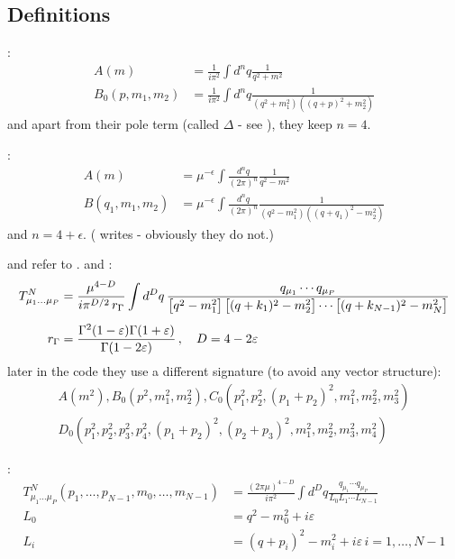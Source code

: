 \subsection{Definitions}
\cite{Passarino:1978jh}:
\begin{align}
A(m) &= \frac 1 {i\pi^2}\int d^nq\frac 1 {q^2+m^2}\\
B_0(p,m_1,m_2) &= \frac 1 {i\pi^2}\int d^nq\frac 1 {(q^2+m_1^2)((q+p)^2+m_2^2)}
\end{align}
and apart from their pole term (called $\Delta$ - see \cite[eq. D.1]{Passarino:1978jh}), they keep $n=4$.

\cite{PhysRevD4054,Bojak:2000eu}:
\begin{align}
A(m) &= \mu^{-\epsilon}\int\frac{d^nq}{(2\pi)^n} \frac 1 {q^2-m^2}\\
B(q_1,m_1,m_2) &= \mu^{-\epsilon}\int\frac{d^nq}{(2\pi)^n} \frac 1 {(q^2-m_1^2)((q+q_1)^2-m_2^2)}
\end{align}
and $n=4+\epsilon$. (\cite{PhysRevD4054} writes  - obviously they do not.)

\HEPMath\cite{wiebusch_hepmath_2015} and \FeynCalc\cite{Mertig:1990an,Shtabovenko:2016sxi} refer to \LoopTools\cite{Hahn:1998yk,LoopTools212Guide}. \cite[eq. (1.1)]{LoopTools212Guide} and \cite[eq. (2.6)]{Ellis:2011cr}:
\begin{align}
T_{\mu_1\ldots\mu_P}^N &=
\frac{\mu^{4 - D}}{i\pi^{D/2}\,r_\Gamma}
\int d^Dq\,
\frac{q_{\mu_1}\cdots q_{\mu_P}}
  {\bigl[q^2 - m_1^2\bigr]\,
   \bigl[(q + k_1)^2 - m_2^2\bigr] \cdots
   \bigl[(q + k_{N - 1})^2 - m_N^2\bigr]} \\[1ex]
\notag
r_\Gamma &= \frac{\Gamma^2(1 - \varepsilon)\Gamma(1+\varepsilon)}
  {\Gamma(1 - 2\varepsilon)}\,,
\quad D = 4 - 2\varepsilon\,
\end{align}
later in the code they use a different signature (to avoid any vector structure):
\begin{align}
A(m^2), B_0(p^2,m_1^2,m_2^2), C_0(p_1^2,p_2^2,(p_1+p_2)^2,m_1^2,m_2^2,m_3^2)\nonumber\\
D_0(p_1^2,p_2^2,p_3^2,p_4^2,(p_1+p_2)^2,(p_2+p_3)^2,m_1^2,m_2^2,m_3^2,m_4^2)
\end{align}

\cite{Denner:2005nn}:
\begin{align}
T_{\mu_1\ldots\mu_P}^N(p_1,\ldots,p_{N-1},m_0,\ldots,m_{N-1}) &= \frac{(2\pi\mu)^{4-D}}{i\pi^2}\int d^Dq \frac{q_{\mu_1}\cdots q_{\mu_P}}{L_0 L_1 \cdots L_{N-1}}\\
L_0 &= q^2-m_0^2 +i\varepsilon\\
L_i &= (q+p_i)^2-m_i^2+i\varepsilon \, i=1,\ldots,N-1
\end{align}

